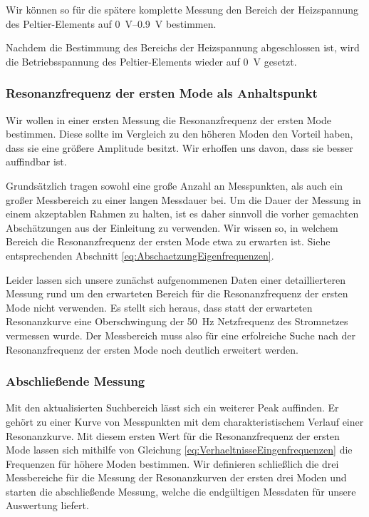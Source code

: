 Wir können so für die spätere komplette Messung den Bereich der Heizspannung des Peltier-Elements auf \SIrange{0}{0.9}{\volt} bestimmen.

Nachdem die Bestimmung des Bereichs der Heizspannung abgeschlossen ist, wird die Betriebsspannung des Peltier-Elements wieder auf \SI{0}{\volt} gesetzt.

\subsubsection*{Resonanzfrequenz der ersten Mode als Anhaltspunkt}

Wir wollen in einer ersten Messung die Resonanzfrequenz der ersten Mode bestimmen.
Diese sollte im Vergleich zu den höheren Moden den Vorteil haben, dass sie eine größere Amplitude besitzt.
Wir erhoffen uns davon, dass sie besser auffindbar ist.

Grundsätzlich tragen sowohl eine große Anzahl an Messpunkten, als auch ein großer Messbereich zu einer langen Messdauer bei.
Um die Dauer der Messung in einem akzeptablen Rahmen zu halten, ist es daher sinnvoll die vorher gemachten Abschätzungen aus der Einleitung zu verwenden.
Wir wissen so, in welchem Bereich die Resonanzfrequenz der ersten Mode etwa zu erwarten ist.
Siehe entsprechenden Abschnitt \ref{eq:AbschaetzungEigenfrequenzen}.

Leider lassen sich unsere zunächst aufgenommenen Daten einer detaillierteren Messung rund um den erwarteten Bereich für die Resonanzfrequenz der ersten Mode nicht verwenden.
Es stellt sich heraus, dass statt der erwarteten Resonanzkurve eine Oberschwingung der \SI{50}{\hertz} Netzfrequenz des Stromnetzes vermessen wurde.
Der Messbereich muss also für eine erfolreiche Suche nach der Resonanzfrequenz der ersten Mode noch deutlich erweitert werden.

\subsubsection*{Abschließende Messung}

Mit den aktualisierten Suchbereich lässt sich ein weiterer Peak auffinden.
Er gehört zu einer Kurve von Messpunkten mit dem charakteristischem Verlauf einer Resonanzkurve.
Mit diesem ersten Wert für die Resonanzfrequenz der ersten Mode lassen sich mithilfe von Gleichung \ref{eq:VerhaeltnisseEingenfrequenzen} die Frequenzen für höhere Moden bestimmen.
Wir definieren schließlich die drei Messbereiche für die Messung der Resonanzkurven der ersten drei Moden und starten die abschließende Messung, welche die endgültigen Messdaten für unsere Auswertung liefert.
